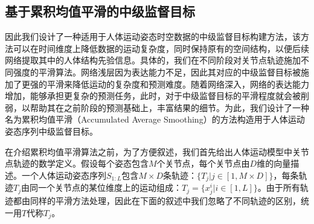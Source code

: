 \subsection{基于累积均值平滑的中级监督目标}
因此我们设计了一种适用于人体运动姿态时空数据的中级监督目标构建方法，该方法可以在时间维度上降低数据的运动复杂度，同时保持原有的空间结构，以便后续网络提取其中的人体结构先验信息。具体的，我们在不同阶段对关节点轨迹施加不同强度的平滑算法。网络浅层因为表达能力不足，因此其对应的中级监督目标被施加了更强的平滑来降低运动的复杂度和预测难度。随着网络深入，网络的表达能力增加，能够承担更复杂的预测任务，此时，对于中级监督目标的平滑程度就会被削弱，以帮助其在之前阶段的预测基础上，丰富结果的细节。为此，我们设计了一种名为累积均值平滑（Accumulated Average Smoothing）的方法构造用于人体运动姿态序列中级监督目标。

在介绍累积均值平滑算法之前，为了方便叙述，我们首先给出人体运动模型中关节点轨迹的数学定义。假设每个姿态包含$M$个关节点，每个关节点由$D$维的向量描述。一个人体运动姿态序列$S_{1:L}$包含$M \times D$条轨迹：$\{T_j|j\in[1, M\times D]\}$，每条轨迹$T_j$由同一个关节点的某位维度上的运动组成：$T_j=\{x^i_j|i\in[1,L]\}$。由于所有轨迹都由同样的平滑方法处理，因此在下面的叙述中我们忽略了不同轨迹的区别，统一用$T$代称$T_j$。

